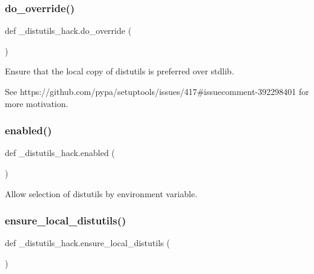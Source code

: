 \mbox{\label{namespace__distutils__hack_a4d3597db607bf8a6ccc19fa89f2746f6}} 
\subsubsection{\texorpdfstring{do\+\_\+override()}{do\_override()}}
{\footnotesize\ttfamily def \+\_\+distutils\+\_\+hack.\+do\+\_\+override (\begin{DoxyParamCaption}{ }\end{DoxyParamCaption})}

\begin{DoxyVerb}Ensure that the local copy of distutils is preferred over stdlib.

See https://github.com/pypa/setuptools/issues/417#issuecomment-392298401
for more motivation.
\end{DoxyVerb}
 \mbox{\label{namespace__distutils__hack_ab663f05918d0530087fdd91ff583aa39}} 
\subsubsection{\texorpdfstring{enabled()}{enabled()}}
{\footnotesize\ttfamily def \+\_\+distutils\+\_\+hack.\+enabled (\begin{DoxyParamCaption}{ }\end{DoxyParamCaption})}

\begin{DoxyVerb}Allow selection of distutils by environment variable.
\end{DoxyVerb}
 \mbox{\label{namespace__distutils__hack_a65ef964befed1f319c1b0c7244caf027}} 
\subsubsection{\texorpdfstring{ensure\+\_\+local\+\_\+distutils()}{ensure\_local\_distutils()}}
{\footnotesize\ttfamily def \+\_\+distutils\+\_\+hack.\+ensure\+\_\+local\+\_\+distutils (\begin{DoxyParamCaption}{ }\end{DoxyParamCaption})}

